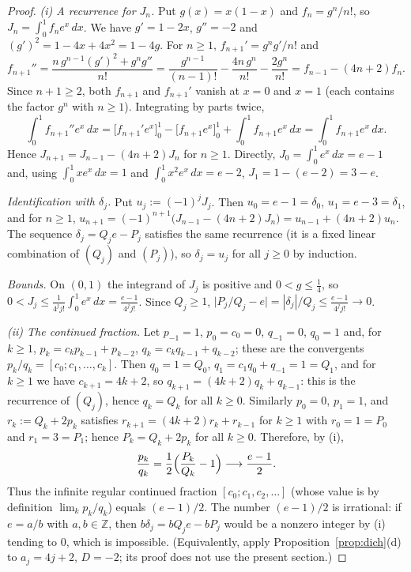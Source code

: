 \documentclass[11pt]{amsart}
\theoremstyle{remark}
\newcommand{\Z}{\mathbb{Z}}
\begin{document}
\begin{proof}
\emph{(i) A recurrence for $J_n$.} Put $g(x)=x(1-x)$ and $f_n=g^n/n!$, so $J_n=\int_0^1f_ne^x\,dx$.
We have $g'=1-2x$, $g''=-2$ and $(g')^2=1-4x+4x^2=1-4g$. For $n\ge1$,
$f_{n+1}'=g^ng'/n!$ and
\[
f_{n+1}''=\frac{n\,g^{n-1}(g')^2+g^ng''}{n!}
=\frac{g^{n-1}}{(n-1)!}-\frac{4n\,g^n}{n!}-\frac{2g^n}{n!}=f_{n-1}-(4n+2)f_n .
\]
Since $n+1\ge2$, both $f_{n+1}$ and $f_{n+1}'$ vanish at $x=0$ and $x=1$ (each contains the factor $g^n$
with $n\ge1$). Integrating by parts twice,
\[
\int_0^1f_{n+1}''e^x\,dx=\bigl[f_{n+1}'e^x\bigr]_0^1-\bigl[f_{n+1}e^x\bigr]_0^1+\int_0^1f_{n+1}e^x\,dx
=\int_0^1f_{n+1}e^x\,dx .
\]
Hence $J_{n+1}=J_{n-1}-(4n+2)J_n$ for $n\ge1$. Directly, $J_0=\int_0^1e^x\,dx=e-1$ and, using
$\int_0^1xe^x\,dx=1$ and $\int_0^1x^2e^x\,dx=e-2$, $J_1=1-(e-2)=3-e$.

\emph{Identification with $\delta_j$.} Put $u_j:=(-1)^jJ_j$. Then $u_0=e-1=\delta_0$, $u_1=e-3=\delta_1$, and for
$n\ge1$, $u_{n+1}=(-1)^{n+1}\bigl(J_{n-1}-(4n+2)J_n\bigr)=u_{n-1}+(4n+2)u_n$. The sequence
$\delta_j=Q_je-P_j$ satisfies the same recurrence (it is a fixed linear combination of $(Q_j)$ and $(P_j)$),
so $\delta_j=u_j$ for all $j\ge0$ by induction.

\emph{Bounds.} On $(0,1)$ the integrand of $J_j$ is positive and $0<g\le\frac14$, so
$0<J_j\le\frac1{4^jj!}\int_0^1e^x\,dx=\frac{e-1}{4^jj!}$. Since $Q_j\ge1$,
$\bigl|P_j/Q_j-e\bigr|=|\delta_j|/Q_j\le\frac{e-1}{4^jj!}\to0$.

\emph{(ii) The continued fraction.} Let $p_{-1}=1$, $p_0=c_0=0$, $q_{-1}=0$, $q_0=1$ and, for $k\ge1$,
$p_k=c_kp_{k-1}+p_{k-2}$, $q_k=c_kq_{k-1}+q_{k-2}$; these are the convergents $p_k/q_k=[c_0;c_1,\dots,c_k]$.
Then $q_0=1=Q_0$, $q_1=c_1q_0+q_{-1}=1=Q_1$, and for $k\ge1$ we have $c_{k+1}=4k+2$, so
$q_{k+1}=(4k+2)q_k+q_{k-1}$: this is the recurrence of $(Q_j)$, hence $q_k=Q_k$ for all $k\ge0$. Similarly
$p_0=0$, $p_1=1$, and $r_k:=Q_k+2p_k$ satisfies $r_{k+1}=(4k+2)r_k+r_{k-1}$ for $k\ge1$ with
$r_0=1=P_0$ and $r_1=3=P_1$; hence $P_k=Q_k+2p_k$ for all $k\ge0$. Therefore, by (i),
\[
\frac{p_k}{q_k}=\frac12\Bigl(\frac{P_k}{Q_k}-1\Bigr)\longrightarrow\frac{e-1}2 .
\]
Thus the infinite regular continued fraction $[c_0;c_1,c_2,\dots]$ (whose value is by definition
$\lim_kp_k/q_k$) equals $(e-1)/2$. The number $(e-1)/2$ is irrational: if $e=a/b$ with $a,b\in\Z$, then
$b\delta_j=bQ_je-bP_j$ would be a nonzero integer by (i) tending to $0$, which is impossible.
(Equivalently, apply Proposition~\ref{prop:dich}(d) to $a_j=4j+2$, $D=-2$; its proof does not use the
present section.)


\end{proof}
\end{document}
